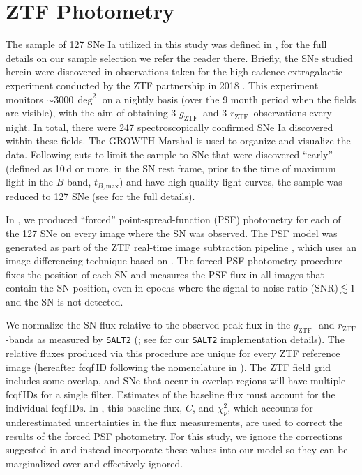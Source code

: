 \documentclass[twocolumn]{./aastex63}
\newcommand{\rztf}{$r_\mathrm{ZTF}$}
\newcommand{\gztf}{$g_\mathrm{ZTF}$}
\newcommand{\tbmax}{$t_{B,\mathrm{max}}$}
\begin{document}
\section{ZTF Photometry}\label{sec:ztf}

The sample of 127 SNe Ia utilized in this study was defined in \citet{Yao19},
for the full details on our sample selection we refer the reader there.
Briefly, the SNe studied herein were discovered in observations taken for the
high-cadence extragalactic experiment conducted by the ZTF partnership in 2018
\citep{Bellm19a}. This experiment monitors $\sim$3000\,$\deg^2$ on a nightly
basis (over the 9 month period when the fields are visible), with the aim of
obtaining 3 \gztf\ and 3 \rztf\ observations every night. In total, there were
247 spectroscopically confirmed SNe Ia discovered within these fields. The
GROWTH Marshal \citep{Kasliwal19} is used to organize and visualize the data.
Following cuts to limit the sample to SNe that were discovered ``early''
(defined as 10\,d or more, in the SN rest frame, prior to the time of maximum
light in the $B$-band, \tbmax) and have high quality light curves, the sample
was reduced to 127 SNe (see \citealt{Yao19} for the full details).

In \citet{Yao19}, we produced ``forced'' point-spread-function (PSF)
photometry for each of the 127 SNe on every image where the SN was observed.
The PSF model was generated as part of the ZTF real-time image subtraction
pipeline \citep{Masci19}, which uses an image-differencing technique based on
\citet{Zackay16}. The forced PSF photometry procedure fixes the position of
each SN and measures the PSF flux in all images that contain the SN position,
even in epochs where the signal-to-noise ratio (SNR)\,$\lesssim 1$ and the SN is
not detected.

We normalize the SN flux relative to the observed peak flux in the \gztf- and
\rztf-bands as measured by \texttt{SALT2} (\citealt{Guy07}; see
\citealt{Yao19} for our \texttt{SALT2} implementation details). The relative
fluxes produced via this procedure are unique for every ZTF reference image
(hereafter fcqf\,ID following the nomenclature in \citealt{Yao19}). The ZTF
field grid includes some overlap, and SNe that occur in overlap regions will
have multiple fcqf\,IDs for a single filter. Estimates of the baseline flux
must account for the individual fcqf\,IDs. In \citet{Yao19}, this baseline
flux, $C$, and $\chi^2_{\nu}$, which accounts for underestimated uncertainties
in the flux measurements, are used to correct the results of the forced PSF
photometry. For this study, we ignore the corrections suggested in
\citet{Yao19} and instead incorporate these values into our model so they can
be marginalized over and effectively ignored.
\end{document}
